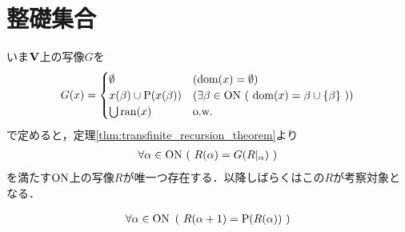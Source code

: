 \section{整礎集合}
	いま$\mathbf{V}$上の写像$G$を
	\begin{align}
		G(x) = 
		\begin{cases}
			\emptyset & (\operatorname{dom}(x) = \emptyset) \\
			x(\beta) \cup \operatorname{P}(x(\beta)) & (
			\exists \beta \in \mathrm{ON}\ (\ \operatorname{dom}(x) = \beta \cup \{\beta\}\ )) \\
			\bigcup \operatorname{ran}(x) & \mathrm{o.w.}
		\end{cases}
	\end{align}
	で定めると，定理\ref{thm:transfinite_recursion_theorem}より
	\begin{align}
		\forall \alpha \in \mathrm{ON}\ (\ R(\alpha) = G(R|_\alpha)\ )
	\end{align}
	を満たす$\mathrm{ON}$上の写像$R$が唯一つ存在する．以降しばらくはこの$R$が考察対象となる．
	
	\begin{screen}
		\begin{thm}
			\begin{align}\label{thm:R_alpha_plus_1_equals_to_power_of_R_alpha}
				\forall \alpha \in \ON\ 
				\left(\ R(\alpha + 1) = \operatorname{P}(R(\alpha))\ \right)
			\end{align}
		\end{thm}
	\end{screen}
	
